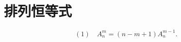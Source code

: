 \documentclass[UTF8]{ctexart}
\begin{document}
\section*{排列恒等式}

\[
(1)\quad A_n^m=(n-m+1)A_n^{m-1}.
\]
\end{document}
